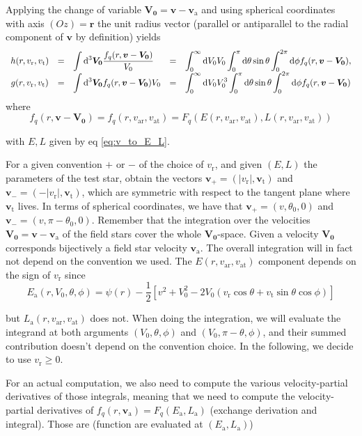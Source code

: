 \documentclass[11pt]{article}
\newcommand{\rt}{\mathrm{t}}
\newcommand{\rr}{\mathrm{r}}
\newcommand{\vr}{v_{\rr}}
\newcommand{\vt}{v_{\rt}}
\newcommand{\bv}{\boldsymbol{v}}
\newcommand{\bvt}{\boldsymbol{\vt}}
\newcommand{\br}{\boldsymbol{r}}
\newcommand{\hr}{\hat{\br}}
\newcommand{\Fq}{F_{q}}
\newcommand{\fq}{f_{q}}
\newcommand{\ra}{\mathrm{a}}
\newcommand{\va}{v_{\ra}}
\newcommand{\bva}{\boldsymbol{\va}}
\newcommand{\bV}[1]{\boldsymbol{V_{#1}}}
\newcommand{\rd}{{\rm{d}}}
\newcommand{\var}{v_{\ra \rr}}
\newcommand{\vat}{v_{\ra \rt}}
\newcommand{\vp}{v_{+}}
\newcommand{\vm}{v_{-}}
\newcommand{\bvp}{\boldsymbol{\vp}}
\newcommand{\bvm}{\boldsymbol{\vm}}
\newcommand{\Ea}{E_{\ra}}
\newcommand{\La}{L_{\ra}}
\begin{document}
Applying the change of variable $\bV0=\bv-\bva$
and using spherical coordinates with axis $(Oz)=\hr$
the unit radius vector (parallel or antiparallel to the radial component
of $\bv$ by definition) yields
\begin{equation}
\begin{array}{cclcl}
  h(r,\vr,\vt) & =&\displaystyle{\int{\rd}^{3}\bV0 \frac{\fq(r,\bv-\bV0)}{V_{0}}} &=& \displaystyle{\int_{0}^{\infty}{\rd}V_{0} V_{0}\int_{0}^{\pi}{\rd}\theta\sin\theta\int_{0}^{2\pi}{\rd}\phi \fq(r,\bv-\bV0)} ,\\
  
  g(r,\vr,\vt) & = &\displaystyle{\int{\rd}^{3}\bV0 \fq(r,\bv-\bV0)V_{0}} &=& \displaystyle{\int_{0}^{\infty}{\rd}V_{0} V_{0}^{3}\int_{0}^{\pi}{\rd}\theta\sin\theta\int_{0}^{2\pi}{\rd}\phi \fq(r,\bv-\bV0)}
\end{array}
\label{eq:Rosenbluth}
\end{equation}
where
\begin{equation}
  \fq(r,\bv-\bV0)=\fq(r,\var,\vat)=\Fq(E(r,\var,\vat),L(r,\var,\vat))
  \label{eq:DFa}
\end{equation}

with $E,L$ given by eq \eqref{eq:v_to_E_L}.

For a given convention $+$ or $-$ of the choice of $\vr$, and
given $(E,L)$ the parameters of the test star, obtain the vectors
$\bvp=(|\vr|,\bvt)$ and $\bvm=(-|\vr|,\bvt)$,
which are symmetric with respect to the tangent plane where $\bvt$
lives. In terms of spherical coordinates, we have that $\bvp=(v,\theta_{0},0)$
and $\bvm=(v,\pi-\theta_{0},0)$. Remember that the
integration over the velocities $\bV0=\bv-\bva$ of
the field stars cover the whole $\boldsymbol{V_{0}}$-space. Given
a velocity $\bV0$ corresponds bijectively a field star
velocity $\bva$. The overall integration will in fact not depend on the convention we used. The $E(r,\var,\vat)$ component depends on the sign of $\vr$ since
\begin{equation}
  \Ea(r,V_{0},\theta,\phi)=\psi(r)-\frac{1}{2}\left[v^{2}+V_{0}^{2}-2V_{0}(\vr\cos\theta+\vt\sin\theta\cos\phi)\right]
  \label{eq:Ea}
\end{equation}

but $\La(r,\var,\vat)$ does not. When doing the integration, we will evaluate the integrand at both arguments $(V_{0},\theta,\phi)$ and  $(V_{0},\pi-\theta,\phi)$, and their summed contribution doesn't depend on the convention choice. In the following, we decide to use $\vr\geq 0$.

For an actual computation, we also
need to compute the various velocity-partial derivatives of those
integrals, meaning that we need to compute the velocity-partial derivatives
of $\fq(r,\bva)=\Fq(\Ea,\La)$ (exchange
derivation and integral). Those are (function are evaluated at $(\Ea,\La)$)
\end{document}

